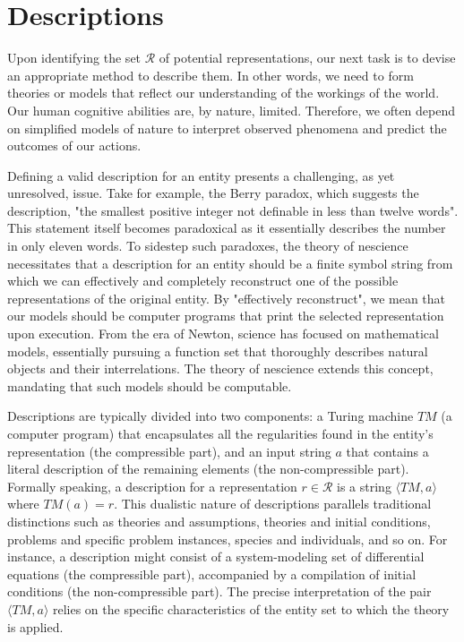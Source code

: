 %
%

\section{Descriptions}

Upon identifying the set $\mathcal{R}$ of potential representations, our next task is to devise an appropriate method to describe them. In other words, we need to form theories or models that reflect our understanding of the workings of the world. Our human cognitive abilities are, by nature, limited. Therefore, we often depend on simplified models of nature to interpret observed phenomena and predict the outcomes of our actions.

Defining a valid description for an entity presents a challenging, as yet unresolved, issue. Take for example, the Berry paradox, which suggests the description, "the smallest positive integer not definable in less than twelve words". This statement itself becomes paradoxical as it essentially describes the number in only eleven words. To sidestep such paradoxes, the theory of nescience necessitates that a description for an entity should be a finite symbol string from which we can effectively and completely reconstruct one of the possible representations of the original entity. By "effectively reconstruct", we mean that our models should be computer programs that print the selected representation upon execution. From the era of Newton, science has focused on mathematical models, essentially pursuing a function set that thoroughly describes natural objects and their interrelations. The theory of nescience extends this concept, mandating that such models should be computable.

Descriptions are typically divided into two components: a Turing machine $TM$ (a computer program) that encapsulates all the regularities found in the entity's representation (the compressible part), and an input string $a$ that contains a literal description of the remaining elements (the non-compressible part). Formally speaking, a description for a representation $r \in \mathcal{R}$ is a string $\langle TM, a \rangle$ where $TM(a) = r$. This dualistic nature of descriptions parallels traditional distinctions such as theories and assumptions, theories and initial conditions, problems and specific problem instances, species and individuals, and so on. For instance, a description might consist of a system-modeling set of differential equations (the compressible part), accompanied by a compilation of initial conditions (the non-compressible part). The precise interpretation of the pair $\langle TM, a \rangle$ relies on the specific characteristics of the entity set to which the theory is applied.

